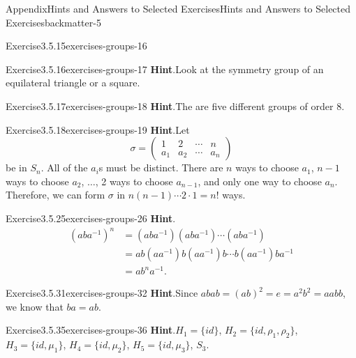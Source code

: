 \documentclass[oneside,10pt,]{book}
\newcommand{\blocktitlefont}{\relax}
\numberwithin{equation}{section}
\begin{document}
\begin{solutions-chapter}{Appendix}{Hints and Answers to Selected Exercises}{}{Hints and Answers to Selected Exercises}{}{}{backmatter-5}
\begin{divisionsolution}{Exercise}{3.5.15}{}{exercises-groups-16}
\end{divisionsolution}%
\begin{divisionsolution}{Exercise}{3.5.16}{}{exercises-groups-17}%
\noindent\textbf{\blocktitlefont Hint}.\hypertarget{exercises-groups-17-2-back}{}\quad{}Look at the symmetry group of an equilateral triangle or a square.%
\end{divisionsolution}%
\begin{divisionsolution}{Exercise}{3.5.17}{}{exercises-groups-18}%
\noindent\textbf{\blocktitlefont Hint}.\hypertarget{exercises-groups-18-2-back}{}\quad{}The are five different groups of order 8.%
\end{divisionsolution}%
\begin{divisionsolution}{Exercise}{3.5.18}{}{exercises-groups-19}%
\noindent\textbf{\blocktitlefont Hint}.\hypertarget{exercises-groups-19-2-back}{}\quad{}Let%
\begin{equation*}
\sigma =
\begin{pmatrix}
1 & 2 & \cdots & n \\ a_1 & a_2 & \cdots & a_n
\end{pmatrix}
\end{equation*}
be in \(S_n\). All of the \(a_i\)s must be distinct. There are \(n\) ways to choose \(a_1\), \(n-1\) ways to choose \(a_2\), \(\ldots\), 2 ways to choose \(a_{n - 1}\), and only one way to choose \(a_n\). Therefore, we can form \(\sigma\) in \(n(n - 1) \cdots 2 \cdot 1 = n!\) ways.%
\end{divisionsolution}%
\begin{divisionsolution}{Exercise}{3.5.25}{}{exercises-groups-26}%
\noindent\textbf{\blocktitlefont Hint}.\hypertarget{exercises-groups-26-2-back}{}\quad{}%
\begin{align*}
(aba^{-1})^n & = (aba^{-1})(aba^{-1}) \cdots (aba^{-1})\\
& = ab(aa^{-1})b(aa^{-1})b \cdots b(aa^{-1})ba^{-1}\\
& = ab^na^{-1}.
\end{align*}
%
\end{divisionsolution}%
\begin{divisionsolution}{Exercise}{3.5.31}{}{exercises-groups-32}%
\noindent\textbf{\blocktitlefont Hint}.\hypertarget{exercises-groups-32-2-back}{}\quad{}Since \(abab = (ab)^2 = e = a^2 b^2 = aabb\), we know that \(ba = ab\).%
\end{divisionsolution}%
\begin{divisionsolution}{Exercise}{3.5.35}{}{exercises-groups-36}%
\noindent\textbf{\blocktitlefont Hint}.\hypertarget{exercises-groups-36-2-back}{}\quad{}\(H_1 = \{ id \}\), \(H_2 = \{ id, \rho_1, \rho_2 \}\), \(H_3 = \{ id, \mu_1 \}\), \(H_4 = \{ id, \mu_2 \}\), \(H_5 = \{ id, \mu_3 \}\), \(S_3\).%

\end{divisionsolution}
\end{solutions-chapter}
\end{document}
